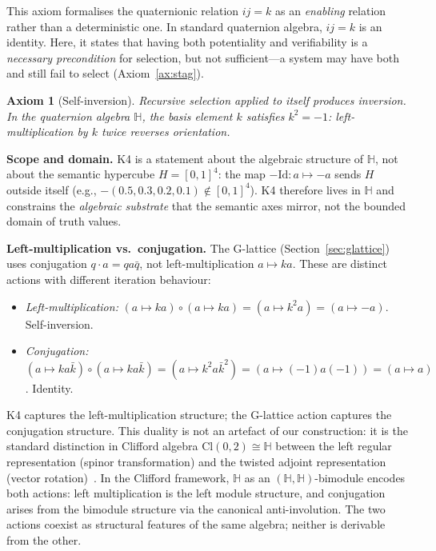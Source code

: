 \documentclass[11pt,a4paper]{article}
\newtheorem{axiom}{Axiom}
\newcommand{\imag}[1]{{\color{icolor}#1}}
\newcommand{\exac}[1]{{\color{jcolor}#1}}
\newcommand{\recu}[1]{{\color{kcolor}#1}}
\def\imag#1{#1}%
\def\exac#1{#1}%
\def\recu#1{#1}%
\begin{document}
This axiom formalises the quaternionic relation $\imag{i}\exac{j} =
\recu{k}$ as an \emph{enabling} relation rather than a deterministic
one. In standard quaternion algebra, $ij = k$ is an identity. Here, it
states that having both potentiality and verifiability is a
\emph{necessary precondition} for selection, but not sufficient---a
system may have both and still fail to select (Axiom~\ref{ax:stag}).

\begin{axiombox}
\begin{axiom}[Self-inversion]\label{ax:inv}
Recursive selection applied to itself produces inversion. In the
quaternion algebra $\mathbb{H}$, the basis element $k$ satisfies
$k^2=-1$: left-multiplication by $k$ twice reverses orientation.
\end{axiom}
\end{axiombox}

\noindent\textbf{Scope and domain.} K4 is a statement about the
algebraic structure of $\mathbb{H}$, not about the semantic
hypercube $H=[0,1]^4$: the map $-\mathrm{Id}:a\mapsto -a$ sends
$H$ outside itself (e.g., $-(0.5,0.3,0.2,0.1)\notin[0,1]^4$).
K4 therefore lives in $\mathbb{H}$ and constrains the
\emph{algebraic substrate} that the semantic axes mirror, not the
bounded domain of truth values.

\smallskip
\noindent\textbf{Left-multiplication vs.\ conjugation.}
The G-lattice (Section~\ref{sec:glattice}) uses conjugation
$q\cdot a=qa\bar{q}$, not left-multiplication $a\mapsto ka$.
These are distinct actions with different iteration behaviour:
\begin{itemize}[nosep]
\item \emph{Left-multiplication:} $(a\mapsto ka)\circ(a\mapsto ka)
  = (a\mapsto k^2 a) = (a\mapsto -a)$. Self-inversion.
\item \emph{Conjugation:} $(a\mapsto ka\bar{k})\circ
  (a\mapsto ka\bar{k}) = (a\mapsto k^2 a\bar{k}^2)
  = (a\mapsto(-1)a(-1)) = (a\mapsto a)$. Identity.
\end{itemize}
K4 captures the left-multiplication structure; the G-lattice
action captures the conjugation structure. This duality is not
an artefact of our construction: it is the standard distinction
in Clifford algebra $\mathrm{Cl}(0,2)\cong\mathbb{H}$ between
the left regular representation (spinor transformation) and the
twisted adjoint representation (vector
rotation)~\citep{lounesto2001,porteous1995}.
In the Clifford framework, $\mathbb{H}$ as an
$(\mathbb{H},\mathbb{H})$-bimodule encodes both actions: left
multiplication is the left module structure, and conjugation arises
from the bimodule structure via the canonical anti-involution.
The two actions coexist as structural features of the same algebra;
neither is derivable from the other.
\end{document}
